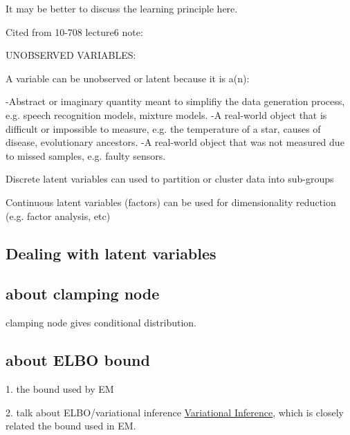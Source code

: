 It may be better to discuss the learning principle here.

Cited from 10-708 lecture6 note:

UNOBSERVED VARIABLES:

A variable can be unobserved or latent because it is a(n):

-Abstract or imaginary quantity meant to simplifiy the data generation process, e.g. speech recognition models, mixture models.
-A real-world object that is difficult or impossible to measure, e.g. the temperature of a star, causes of disease, evolutionary ancestors.
-A real-world object that was not measured due to missed samples, e.g. faulty sensors.

Discrete latent variables can used to partition or cluster data into sub-groups

Continuous latent variables (factors) can be used for dimensionality reduction (e.g. factor analysis, etc)
\subsection{Dealing with latent variables}
\subsection{about clamping node}
clamping node gives conditional distribution.

\subsection{about ELBO bound}
1. the bound used by EM

2. talk about ELBO/variational inference \href{https://media.nips.cc/Conferences/2016/Slides/6199-Slides.pdf}{Variational Inference}, which is closely related the bound used in EM.

